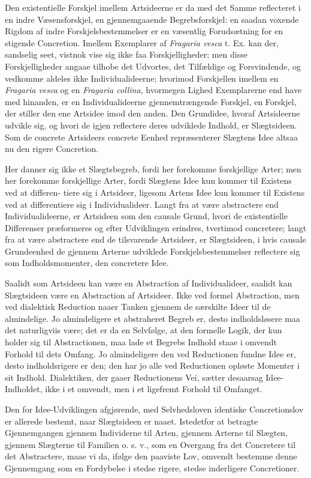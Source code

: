 \documentclass[12pt,a4paper]{book}
\begin{document}
Den existentielle Forskjel imellem Artsideerne er da med det Samme reflecteret i
en indre Væsensforskjel, en gjennemgaaende Begrebsforskjel: en saadan voxende
Rigdom af indre Forskjelsbestemmelser er en væsentlig Forudsætning for en
stigende Concretion. Imellem Exemplarer af \textit{Fragaria vesca} t. Ex. kan
der, sandselig seet, vistnok vise sig ikke faa Forskjelligheder; men disse
Forskjelligheder angaae tilhobe det Udvortes, det Tilfældige og Forsvindende, og
vedkomme aldeles ikke Individualideerne; hvorimod Forskjellen imellem en
\textit{Fragaria vesca} og en \textit{Fragaria collina}, hvormegen Lighed
Exemplarerne end have med hinanden, er en Individualideerne gjennemtrængende
Forskjel, en Forskjel, der stiller den ene Artsidee imod den anden. Den
Grundidee, hvoraf Artsideerne udvikle sig, og hvori de igjen reflectere deres
udviklede Indhold, er Slægtsideen. Som de concrete Artsideers concrete Eenhed
repræsenterer Slægtens Idee altsaa nu den rigere Concretion.

Her danner sig ikke et Slægtsbegreb, fordi her forekomme forskjellige Arter; men
her forekomme forskjellige Arter, fordi Slægtens Idee kun kommer til Existens
ved at differen-
tiere sig i Artsideer, ligesom Artens Idee kun kommer til Existens ved at
differentiere sig i Individualideer. Langt fra at være abstractere end
Individualideerne, er Artsideen som den causale Grund, hvori de existentielle
Differenser præformeres og efter Udviklingen erindres, tvertimod concretere;
langt fra at være abstractere end de tilsvarende Artsideer, er Slægtsideen, i
hvis causale Grundeenhed de gjennem Arterne udviklede Forskjelsbestemmelser
reflectere sig som Indholdsmomenter, den concretere Idee.

Saalidt som Artsideen kan være en Abstraction af Individualideer, saalidt kan
Slægtsideen være en Abstraction af Artsideer. Ikke ved formel Abstraction, men
ved dialektisk Reduction naaer Tanken gjennem de særskilte Ideer til de
almindelige. Jo almindeligere et abstraheret Begreb er, desto indholdsløsere maa
det naturligviis være; det er da en Selvfølge, at den formelle Logik, der kun
holder sig til Abstractionen, maa lade et Begrebs Indhold staae i omvendt
Forhold til dets Omfang. Jo almindeligere den ved Reductionen fundne Idee er,
desto indholdsrigere er den; den har jo alle ved Reductionen opløste Momenter i
sit Indhold. Dialektiken, der gaaer Reductionens Vei, sætter desaarsag
Idee-Indholdet, ikke i et omvendt, men i et ligefremt Forhold til Omfanget.

Den for Idee-Udviklingen afgjørende, med Selvhedsloven identiske Concretionslov
er allerede bestemt, naar Slægtsideen er naaet. Istedetfor at betragte
Gjennemgangen gjennem Individerne til Arten, gjennem Arterne til Slægten,
gjennem Slægterne til Familien o. s. v., som en Overgang fra det Concretere til
det Abstractere, maae vi da, ifølge den paaviste Lov, omvendt bestemme denne
Gjennemgang som en Fordybelse i stedse rigere, stedse inderligere Concretioner.
\end{document}
